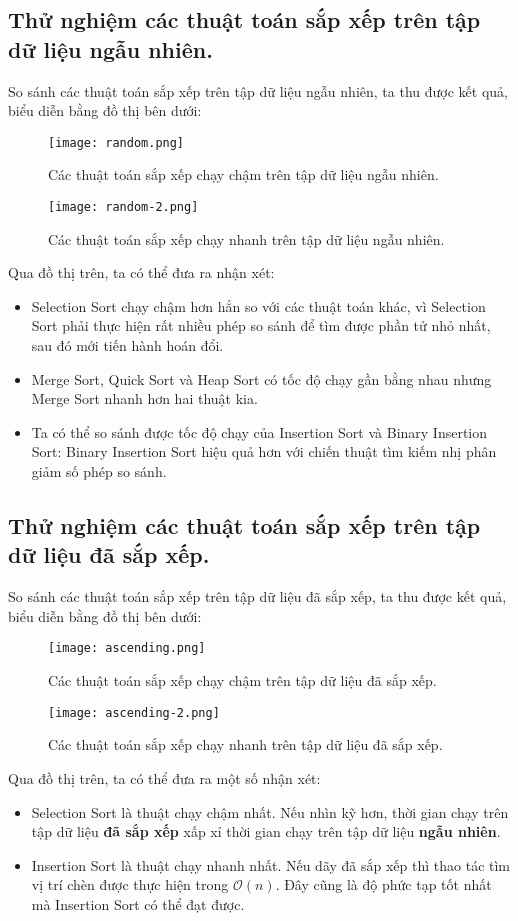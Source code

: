 \documentclass[]{article}
\begin{document}
\subsection{Thử nghiệm các thuật toán sắp xếp trên tập dữ liệu ngẫu nhiên.}
So sánh các thuật toán sắp xếp trên tập dữ liệu ngẫu nhiên, ta thu được kết quả, biểu diễn bằng đồ thị bên dưới:
\begin{figure}[H]
\centering
\texttt{[image: random.png]}
\caption{Các thuật toán sắp xếp chạy chậm trên tập dữ liệu ngẫu nhiên.}
\end{figure}
\begin{figure}[H]
\centering
\texttt{[image: random-2.png]}
\caption{Các thuật toán sắp xếp chạy nhanh trên tập dữ liệu ngẫu nhiên.}
\end{figure}
Qua đồ thị trên, ta có thể đưa ra nhận xét:
\begin{itemize}
\item Selection Sort chạy chậm hơn hẳn so với các thuật toán khác, vì Selection Sort phải thực hiện rất nhiều phép so sánh để tìm được phần tử nhỏ nhất, sau đó mới tiến hành hoán đổi.
\item Merge Sort, Quick Sort và Heap Sort có tốc độ chạy gần bằng nhau nhưng Merge Sort nhanh hơn hai thuật kia.
\item Ta có thể so sánh được tốc độ chạy của Insertion Sort và Binary Insertion Sort: Binary Insertion Sort hiệu quả hơn với chiến thuật tìm kiếm nhị phân giảm số phép so sánh.
\end{itemize}

\subsection{Thử nghiệm các thuật toán sắp xếp trên tập dữ liệu đã sắp xếp.}
So sánh các thuật toán sắp xếp trên tập dữ liệu đã sắp xếp, ta thu được kết quả, biểu diễn bằng đồ thị bên dưới:
\begin{figure}[H]
\centering
\texttt{[image: ascending.png]}
\caption{Các thuật toán sắp xếp chạy chậm trên tập dữ liệu đã sắp xếp.}
\end{figure}
\begin{figure}[H]
\centering
\texttt{[image: ascending-2.png]}
\caption{Các thuật toán sắp xếp chạy nhanh trên tập dữ liệu đã sắp xếp.}
\end{figure}
Qua đồ thị trên, ta có thể đưa ra một số nhận xét:
\begin{itemize}
\item Selection Sort là thuật chạy chậm nhất. Nếu nhìn kỹ hơn, thời gian chạy trên tập dữ liệu \textbf{đã sắp xếp} xấp xỉ thời gian chạy trên tập dữ liệu \textbf{ngẫu nhiên}.
\item Insertion Sort là thuật chạy nhanh nhất. Nếu dãy đã sắp xếp thì thao tác tìm vị trí chèn được thực hiện trong $\mathcal{O}(n)$. Đây cũng là độ phức tạp tốt nhất mà Insertion Sort có thể đạt được.
\end{itemize}
\end{document}
